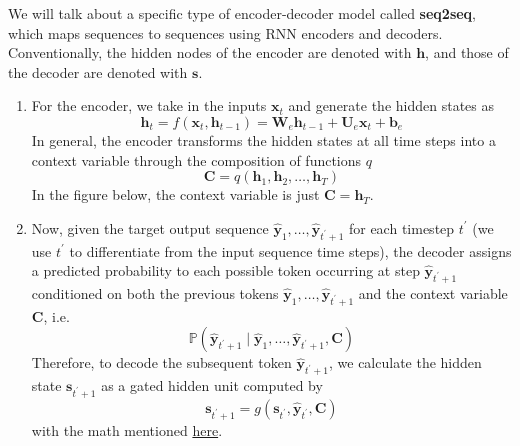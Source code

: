 \documentclass{article}
\begin{document}
  We will talk about a specific type of encoder-decoder model called \textbf{seq2seq}, which maps sequences to sequences using RNN encoders and decoders. Conventionally, the hidden nodes of the encoder are denoted with $\mathbf{h}$, and those of the decoder are denoted with $\mathbf{s}$. 
  \begin{enumerate}
      \item For the encoder, we take in the inputs $\mathbf{x}_t$ and generate the hidden states as 
      \begin{equation}
        \mathbf{h}_t = f(\mathbf{x}_t, \mathbf{h}_{t-1}) = \mathbf{W}_e \mathbf{h}_{t-1} + \mathbf{U}_e \mathbf{x}_t + \mathbf{b}_e
      \end{equation}
      In general, the encoder transforms the hidden states at all time steps into a context variable through the composition of functions $q$ 
      \[\mathbf{C} = q(\mathbf{h}_1, \mathbf{h}_2, \ldots, \mathbf{h}_T)\]
      In the figure below, the context variable is just $\mathbf{C} = \mathbf{h}_T$. 

      \item Now, given the target output sequence $\hat{\mathbf{y}}_1, \ldots, \hat{\mathbf{y}}_{t^\prime + 1}$ for each timestep $t^\prime$ (we use $t^\prime$ to differentiate from the input sequence time steps), the decoder assigns a predicted probability to each possible token occurring at step $\hat{\mathbf{y}}_{t^\prime + 1}$ conditioned on both the previous tokens $\hat{\mathbf{y}}_1, \ldots, \hat{\mathbf{y}}_{t^\prime + 1}$ and the context variable $\mathbf{C}$, i.e. 
      \[\mathbb{P}(\hat{\mathbf{y}}_{t^\prime + 1} \mid \hat{\mathbf{y}}_1, \ldots, \hat{\mathbf{y}}_{t^\prime + 1}, \mathbf{C})\]
      Therefore, to decode the subsequent token $\hat{\mathbf{y}}_{t^\prime + 1}$, we calculate the hidden state $\mathbf{s}_{t^\prime + 1}$ as a gated hidden unit computed by 
      \[\mathbf{s}_{t^\prime + 1} = g(\mathbf{s}_{t^\prime}, \hat{\mathbf{y}}_{t^\prime}, \mathbf{C})\]
      with the math mentioned \href{https://arxiv.org/pdf/1409.0473.pdf#page=12}{here}. 
  \end{enumerate}
\end{document}
